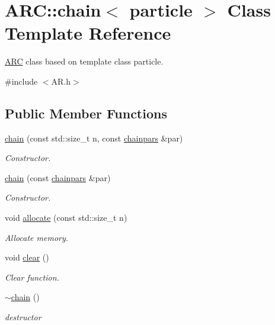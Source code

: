 \hypertarget{classARC_1_1chain}{}\section{A\+RC\+:\+:chain$<$ particle $>$ Class Template Reference}
\label{classARC_1_1chain}


\hyperlink{namespaceARC}{A\+RC} class based on template class particle.  




{\ttfamily \#include $<$A\+R.\+h$>$}

\subsection*{Public Member Functions}
\begin{DoxyCompactItemize}
\item 
\hyperlink{classARC_1_1chain_a6bea4b3b275ff07d8caa924fdd07852b}{chain} (const std\+::size\+\_\+t n, const \hyperlink{classARC_1_1chainpars}{chainpars} \&par)
\begin{DoxyCompactList}\small\item\em Constructor. \end{DoxyCompactList}\item 
\hyperlink{classARC_1_1chain_ab4777422b1d084dabdfa1d561ad5ba02}{chain} (const \hyperlink{classARC_1_1chainpars}{chainpars} \&par)
\begin{DoxyCompactList}\small\item\em Constructor. \end{DoxyCompactList}\item 
void \hyperlink{classARC_1_1chain_ad0abd7b957e9d88ad2f1823f06d28a4a}{allocate} (const std\+::size\+\_\+t n)
\begin{DoxyCompactList}\small\item\em Allocate memory. \end{DoxyCompactList}\item 
void \hyperlink{classARC_1_1chain_a5299fa50788dc7e5d15504c33f76333f}{clear} ()
\begin{DoxyCompactList}\small\item\em Clear function. \end{DoxyCompactList}\item 
\hyperlink{classARC_1_1chain_a3467a68afb2daebec6c57899897a461c}{$\sim$chain} ()
\begin{DoxyCompactList}\small\item\em destructor \end{DoxyCompactList}\item 

\end{DoxyCompactItemize}

